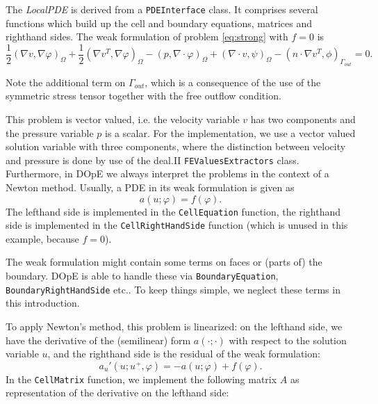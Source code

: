 \vspace{0.2cm}

The \textit{LocalPDE} is derived from a \texttt{PDEInterface} class. It comprises several functions which build up the cell and boundary equations, matrices and righthand sides. The weak formulation of problem \eqref{eq:strong} with $f=0$ is
\begin{equation} \label{eq:weak}
   \frac{1}{2}(\nabla v, \nabla \varphi)_\Omega + \frac{1}{2}(\nabla v^{T}, \nabla \varphi)_\Omega - (p, \nabla \cdot \varphi)_\Omega + (\nabla \cdot v, \psi)_\Omega - (n\cdot \nabla v^T,\phi)_{\Gamma_{out}} = 0.
\end{equation}
\begin{remark}
Note the additional term on $\Gamma_{out}$, which is a consequence of the use of the symmetric stress tensor together with the free outflow condition.
\end{remark}
This problem is vector valued, i.e. the velocity variable $v$ has two components and the pressure variable $p$ is a scalar. For the implementation, we use a vector valued solution variable with three components, where the distinction between velocity and pressure is done by use of the deal.II \texttt{FEValuesExtractors} class. \\
Furthermore, in DOpE we always interpret the problems in the context of a Newton method. Usually, a PDE in its weak formulation is given as
\begin{equation*}
   a(u;\varphi) = f(\varphi).
\end{equation*}
The lefthand side is implemented in the \texttt{CellEquation} function, the righthand side is implemented in the \texttt{CellRightHandSide} function (which is unused in this example, because $f=0$).
\begin{remark}
The weak formulation might contain some terms on faces or (parts of) the boundary. DOpE is able to handle these via \texttt{BoundaryEquation}, \texttt{BoundaryRightHandSide} etc.. To keep things simple, we neglect these terms in this introduction.
\end{remark}
To apply Newton's method, this problem is linearized: on the lefthand side, we have the derivative of the (semilinear) form $a(\cdot;\cdot)$ with respect to the solution variable $u$, and the righthand side is the residual of the weak formulation:
\begin{equation*}
   a_u'(u;u^+,\varphi) = -a(u;\varphi) + f(\varphi).
\end{equation*}
In the \texttt{CellMatrix} function, we implement the following matrix $A$ as representation of the derivative on the lefthand side:
